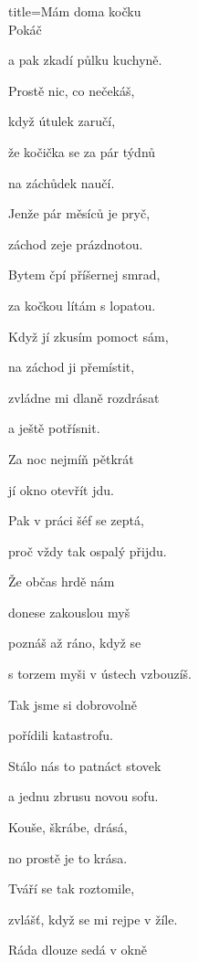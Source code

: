 \begin{song}{title=\predtitle\centering Mám doma kočku\\\large Pokáč \vspace*{-0.3cm}}
{\begin{varwidth}[t]{0.48\textwidth}
   a pak zkadí půlku kuchyně.
   
   
\sloka
   Prostě nic, co nečekáš,
   
   když útulek zaručí,
   
   že kočička se za pár týdnů
   
   na záchůdek naučí.
  
  
\end{varwidth}\mezisloupci\begin{varwidth}[t]{0.5\textwidth}\setlength{\parindent}{0.45cm}\vspace*{0.65cm}  %

\sloka   
   Jenže pár měsíců je pryč,
   
   záchod zeje prázdnotou.
   
   Bytem čpí příšernej smrad,
   
   za kočkou lítám s lopatou.
 
 
\sloka
   Když jí zkusím pomoct sám,
   
   na záchod ji přemístit,
   
   zvládne mi dlaně rozdrásat
   
   a ještě potřísnit.
  
   
   
   
\sloka
   Za noc nejmíň pětkrát
   
   jí okno otevřít jdu.
   
   Pak v práci šéf se zeptá,
   
   proč vždy tak ospalý přijdu.
   
   
\sloka
   Že občas hrdě nám
   
   donese zakouslou myš
   
   poznáš až ráno, když se
   
   s torzem myši v ústech vzbouzíš.
  
   
\sloka
   Tak jsme si dobrovolně
   
   pořídili katastrofu.
   
   Stálo nás to patnáct stovek
   
   a jednu zbrusu novou sofu.
   
   
\sloka
   Kouše, škrábe, drásá,
   
   no prostě je to krása.
   
   Tváří se tak roztomile,
   
   zvlášť, když se mi rejpe v žíle.
   
   
   
   
\sloka
   Ráda dlouze sedá v okně
   

\end{varwidth}}
\end{song}
